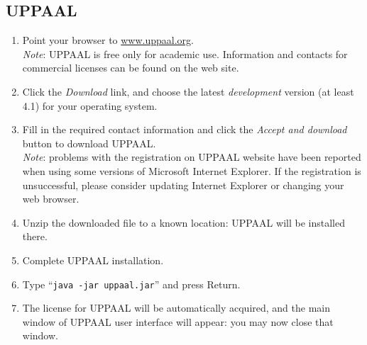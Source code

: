 \subsection{UPPAAL}\label{sec:install-uppaal}
\begin{enumerate}
\item Point your browser to \url{www.uppaal.org}.\\
\emph{Note}: UPPAAL is free only for
academic use. Information and contacts for commercial licenses can be found on the web site.
\item Click the \emph{Download} link, and choose the latest \emph{development} version (at least 4.1) for your operating system.
\item Fill in the required contact information and click the \emph{Accept and download} button to download UPPAAL.\\
\emph{Note}: problems with the registration on UPPAAL website have been reported when using some versions of Microsoft Internet Explorer.
If the registration is unsuccessful, please consider updating Internet Explorer or changing your web browser.
\item Unzip the downloaded file to a known location: UPPAAL will be installed there.
\item\label{step:mac-install-uppaal} Complete UPPAAL installation. 
\item Type ``{\tt java -jar uppaal.jar}'' and press Return.
\item The license for UPPAAL will be automatically acquired, and the main window of UPPAAL user interface will appear:
you may now close that window.
\end{enumerate}

